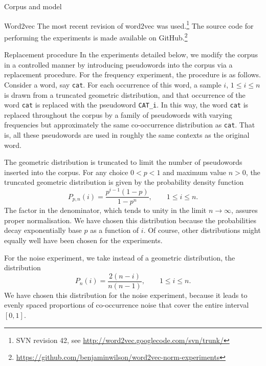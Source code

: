 \documentclass{article} %
\newcommand{\word}[1]{\texttt{#1}}
\begin{document}
\begin{section}{Corpus and model}
\begin{subsection}{Word2vec}
The most recent revision of word2vec was used.\footnote{SVN revision 42, see
\url{http://word2vec.googlecode.com/svn/trunk/}} The source code for performing
the experiments is made available on
GitHub.\footnote{\url{https://github.com/benjaminwilson/word2vec-norm-experiments}}

\begin{table}
	
	\caption{ Number of words, by frequency band, as observed in the
          unmodified corpus.  }
	\label{word-occurrences-table}
\end{table}
\end{subsection}

\begin{subsection}{Replacement procedure}\label{replacement-procedure}
In the experiments detailed below, we modify the corpus in a controlled
manner by introducing pseudowords into the corpus via a replacement
procedure.  For the frequency experiment, the procedure is as follows.
Consider a word, say \word{cat}.  For each occurrence of this word, a
sample $i$, $1 \leqslant i \leqslant n$ is drawn from a truncated
geometric distribution, and that occurrence of the word \word{cat} is
replaced with the pseudoword \word{CAT\_i}.  In this way, the word \word{cat}
is replaced throughout the corpus by a family of pseudowords with varying
frequencies but approximately the same co-occurrence distribution as
\word{cat}.  That is, all these pseudowords are used in roughly the same
contexts as the original word.

The geometric distribution is truncated to limit the number of pseudowords
inserted into the corpus.  For any choice $0 < p < 1$ and maximum value
$n > 0$, the truncated geometric distribution is given by the
probability density function
\begin{equation} 
\label{distro}
P_{p, n} (i) = \frac{p^{i-1}  (1-p)}{1 - p^n}, \qquad 1
\leqslant i \leqslant n.
\end{equation} 
The factor in the denominator, which tends to unity in the limit $n \to
\infty$, assures proper normalisation.  We have chosen this distribution
because the probabilities decay exponentially base $p$ as a function of
$i$.  Of course, other distributions might equally well have been chosen
for the experiments.

For the noise experiment, we take instead of a geometric distribution,
the distribution
\begin{equation}
\label{distro2} 
P_n (i) = \frac{2 (n-i)}{n(n-1)} , \qquad 1 \leqslant i \leqslant n.
\end{equation} 
We have chosen this distribution for the noise experiment, because it
leads to evenly spaced proportions of co-occurrence noise that cover the entire interval
$[0,1]$.
\end{subsection}
\end{section}
\end{document}
